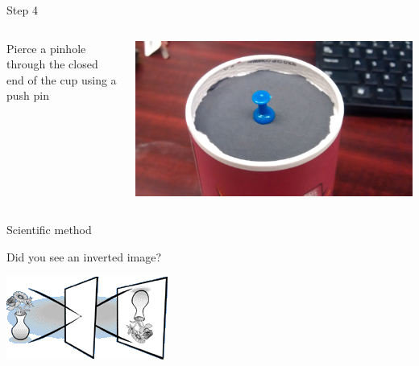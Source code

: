 \begin{frame}{Step 4}
  \begin{columns}
    \begin{column}{0.6\textwidth}
      Pierce a pinhole through the closed end of the cup using a push pin
    \end{column}
    \begin{column}{0.4\textwidth}
      \includegraphics[width=\textwidth]{media/pushpin.jpg}
    \end{column}
  \end{columns}
\end{frame}

\begin{frame}[fragile]{Scientific method}
  
\end{frame}

\begin{frame}{Did you see an inverted image?}
  \begin{center}
    \includegraphics{media/upside_down_vase.png}
  \end{center}
\end{frame}

